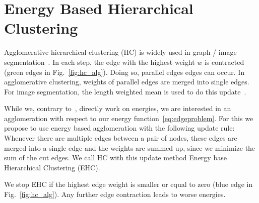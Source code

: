 \documentclass[10pt,twocolumn,letterpaper]{article}
\theoremstyle{definition}
\begin{document}

%
%


\section{Energy Based Hierarchical Clustering}\label{sec:ehc}
Agglomerative hierarchical clustering (HC) is widely used
in graph / image segmentation~\cite{arbelaez_2006}.
In each step, the edge with the highest weight $w$ is
contracted (green edges in Fig.~\ref{fig:hc_alg}).
Doing so, parallel edges edges can occur.
In agglomerative clustering, weights of
parallel edges are merged into single edges.
For image segmentation, the length
weighted mean is used to do this update~\cite{arbelaez_2006}.

While we, contrary to~\cite{arbelaez_2006}, directly work on energies, we are interested in an 
agglomeration with respect to our energy function~\ref{eq:edgeproblem}.
For this we propose to use energy based agglomeration
with the following update rule:
Whenever there are multiple edges between 
a pair of nodes, these edges are merged into a single edge
and the weights are summed up, since we 
minimize the sum of the cut edges.
We call HC with this update method Energy base Hierarchical Clustering (EHC).

We stop EHC if the highest edge weight is
smaller or equal to zero  (blue edge in Fig.~\ref{fig:hc_alg}). Any further edge
contraction leads to worse energies.




\end{document}
